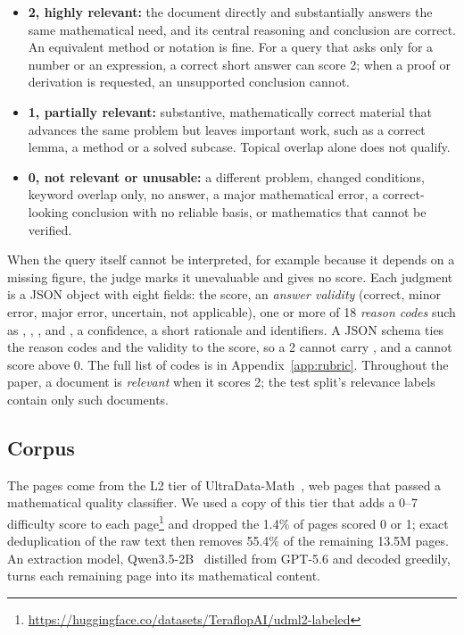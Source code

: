 \begin{itemize}
    \item \textbf{2, highly relevant:} the document directly and substantially answers the same mathematical need, and its central reasoning and conclusion are correct. An equivalent method or notation is fine. For a query that asks only for a number or an expression, a correct short answer can score 2; when a proof or derivation is requested, an unsupported conclusion cannot.
    \item \textbf{1, partially relevant:} substantive, mathematically correct material that advances the same problem but leaves important work, such as a correct lemma, a method or a solved subcase. Topical overlap alone does not qualify.
    \item \textbf{0, not relevant or unusable:} a different problem, changed conditions, keyword overlap only, no answer, a major mathematical error, a correct-looking conclusion with no reliable basis, or mathematics that cannot be verified.
\end{itemize}

When the query itself cannot be interpreted, for example because it depends on a missing figure, the judge marks it unevaluable and gives no score. Each judgment is a JSON object with eight fields: the score, an \emph{answer validity} (correct, minor error, major error, uncertain, not applicable), one or more of 18 \emph{reason codes} such as , , ,  and , a confidence, a short rationale and identifiers. A JSON schema ties the reason codes and the validity to the score, so a 2 cannot carry , and a  cannot score above 0. The full list of codes is in Appendix~\ref{app:rubric}. Throughout the paper, a document is \emph{relevant} when it scores 2; the test split's relevance labels contain only such documents.

\subsection{Corpus}
\label{sec:corpus}

The pages come from the L2 tier of UltraData-Math~\citep{ultradata-math}, web pages that passed a mathematical quality classifier. We used a copy of this tier that adds a 0--7 difficulty score to each page\footnote{\url{https://huggingface.co/datasets/TeraflopAI/udml2-labeled}} and dropped the 1.4\% of pages scored 0 or 1; exact deduplication of the raw text then removes 55.4\% of the remaining 13.5M pages. An extraction model, Qwen3.5-2B~\citep{qwen2026qwen35} distilled from GPT-5.6 and decoded greedily, turns each remaining page into its mathematical content.

